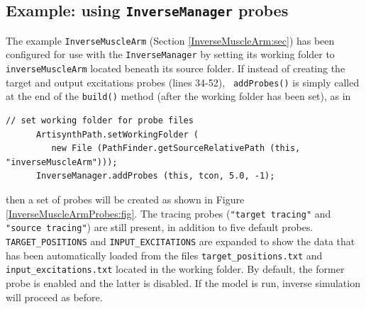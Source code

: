 \subsection{Example: using {\tt InverseManager} probes}

The example {\tt InverseMuscleArm} (Section \ref{InverseMuscleArm:sec}) has
been configured for use with the {\tt InverseManager} by setting its working
folder to {\tt inverseMuscleArm} located beneath its source folder.  If instead
of creating the target and output excitations probes (lines 34-52), {\tt
addProbes()} is simply called at the end of the {\tt build()} method (after the
working folder has been set), as in
%
\begin{lstlisting}[]
      // set working folder for probe files
      ArtisynthPath.setWorkingFolder (
         new File (PathFinder.getSourceRelativePath (this, "inverseMuscleArm")));
      InverseManager.addProbes (this, tcon, 5.0, -1);
\end{lstlisting}
%
then a set of probes will be created as shown in
Figure \ref{InverseMuscleArmProbes:fig}. The tracing probes ({\tt "target
tracing"} and {\tt "source tracing"}) are still present, in addition to five
default probes. {\tt TARGET\_POSITIONS} and {\tt INPUT\_EXCITATIONS} are
expanded to show the data that has been automatically loaded from the files
{\tt target\_positions.txt} and \pdfbreak 
{\tt input\_excitations.txt} located in the
working folder. By default, the former probe is enabled and the latter is
disabled. If the model is run, inverse simulation will proceed as before.

